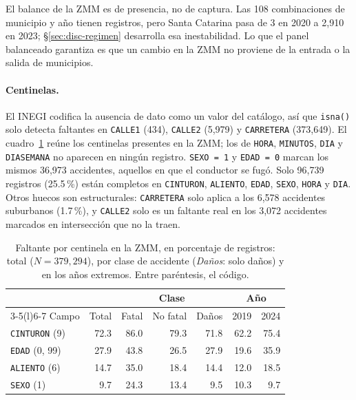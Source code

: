El balance de la ZMM es de presencia, no de captura. Las 108 combinaciones de
municipio y año tienen registros, pero Santa Catarina pasa de 3 en 2020 a 2,910
en 2023; §\ref{sec:disc-regimen} desarrolla esa inestabilidad. Lo que el panel
balanceado garantiza es que un cambio en la ZMM no proviene de la entrada o la
salida de municipios.

\paragraph{Centinelas.} El INEGI codifica la ausencia de dato como un valor del
catálogo, así que \texttt{isna()} solo detecta faltantes en \texttt{CALLE1} (434),
\texttt{CALLE2} (5,979) y \texttt{CARRETERA} (373,649). El
cuadro~\ref{tab:datos-centinelas} reúne los centinelas presentes en la ZMM; los de
\texttt{HORA}, \texttt{MINUTOS}, \texttt{DIA} y \texttt{DIASEMANA} no aparecen en
ningún registro. \texttt{SEXO = 1} y \texttt{EDAD = 0} marcan los mismos 36,973
accidentes, aquellos en que el conductor se fugó. Solo 96,739 registros
(25.5\,\%) están completos en \texttt{CINTURON}, \texttt{ALIENTO}, \texttt{EDAD},
\texttt{SEXO}, \texttt{HORA} y \texttt{DIA}. Otros huecos son estructurales:
\texttt{CARRETERA} solo aplica a los 6,578 accidentes suburbanos (1.7\,\%), y
\texttt{CALLE2} solo es un faltante real en los 3,072 accidentes marcados en
intersección que no la traen.

\begin{table}
	\centering\footnotesize
	\caption{Faltante por centinela en la ZMM, en porcentaje de registros: total
		($N = 379{,}294$), por clase de accidente (\emph{Daños}: solo daños) y en los
		años extremos. Entre paréntesis, el código.}
	\label{tab:datos-centinelas}
	\begin{tabular}{@{}lrrrrrr@{}}
		\toprule
		                       &       & \multicolumn{3}{c}{Clase} & \multicolumn{2}{c}{Año}                       \\
		\cmidrule(lr){3-5}\cmidrule(l){6-7}
		Campo                  & Total & Fatal                     & No fatal                & Daños & 2019 & 2024 \\
		\midrule
		\texttt{CINTURON} (9)  & 72.3  & 86.0                      & 79.3                    & 71.8  & 62.2 & 75.4 \\
		\texttt{EDAD} (0, 99)  & 27.9  & 43.8                      & 26.5                    & 27.9  & 19.6 & 35.9 \\
		\texttt{ALIENTO} (6)   & 14.7  & 35.0                      & 18.4                    & 14.4  & 12.0 & 18.5 \\
		\texttt{SEXO} (1)      & 9.7   & 24.3                      & 13.4                    & 9.5   & 10.3 & 9.7  \\
		\bottomrule
	\end{tabular}
\end{table}


